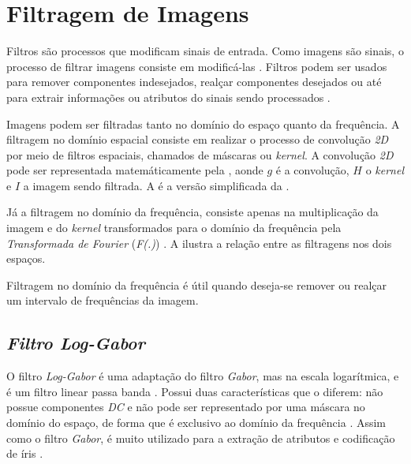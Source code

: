 \section{Filtragem de Imagens} \label{sec:fundamentacao:filtragem}

\par Filtros são processos que modificam sinais de entrada. Como imagens são sinais, o processo de filtrar imagens consiste em modificá-las \cite{gonsalez2006}. Filtros podem ser usados para remover componentes indesejados, realçar componentes desejados ou até para extrair informações ou atributos do sinais sendo processados \cite{loggabor-kovesi}.

\par Imagens podem ser filtradas tanto no domínio do espaço quanto da frequência. A filtragem no domínio espacial consiste em realizar o processo de convolução \textit{2D} por meio de filtros espaciais, chamados de máscaras ou \textit{kernel}\cite{oppenheim2013signals}. A convolução \textit{2D} pode ser representada matemáticamente pela , aonde $g$ é a convolução, $H$ o \textit{kernel} e $I$ a imagem sendo filtrada\cite{gonsalez2006}. A  é a versão simplificada da . 



\par Já a filtragem no domínio da frequência, consiste apenas na multiplicação da imagem e do \textit{kernel} transformados para o domínio da frequência pela \textit{Transformada de Fourier} (\textit{F(.)}) \cite{gonsalez2006}. A  ilustra a relação entre as filtragens nos dois espaços.


\par Filtragem no domínio da frequência é útil quando deseja-se remover ou realçar um intervalo de frequências da imagem.

\subsection{\textit{Filtro Log-Gabor}}\label{sec:fundamentacao:filtragem:loggabor}

\par O filtro \textit{Log-Gabor} é uma adaptação do filtro \textit{Gabor}, mas na escala logarítmica, e é um filtro linear passa banda \cite{field1987-loggabor}. Possui duas características que o diferem: não possue componentes \textit{DC} e não pode ser representado por uma máscara no domínio do espaço, de forma que é exclusivo ao domínio da frequência \cite{loggabor-kovesi}. Assim como o filtro \textit{Gabor}, é muito utilizado para a extração de atributos e codificação de íris \cite{masek2003}.

